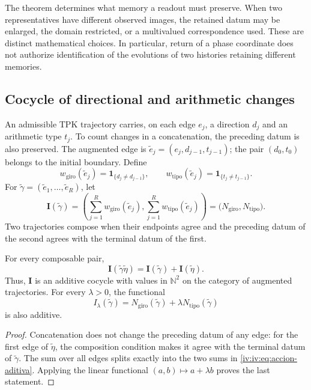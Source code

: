 The theorem determines what memory a readout
must preserve. When two representatives have different observed
images, the retained datum may be enlarged, the domain
restricted, or a multivalued correspondence used.
These are distinct mathematical choices. In particular,
return of a phase coordinate does not authorize identification
of the evolutions of two histories retaining different
memories.

\subsection{Cocycle of directional and arithmetic changes}

An admissible TPK trajectory carries, on each edge
\(e_j\), a direction \(d_j\) and an arithmetic type
\(t_j\). To count changes in a concatenation,
the preceding datum is also preserved. The augmented edge is
\(\widetilde e_j=(e_j,d_{j-1},t_{j-1})\); the pair
\((d_0,t_0)\) belongs to the initial boundary. Define
\[
 w_{\mathrm{giro}}(\widetilde e_j)
       =\mathbf1_{\{d_j\ne d_{j-1}\}},\qquad
 w_{\mathrm{tipo}}(\widetilde e_j)
       =\mathbf1_{\{t_j\ne t_{j-1}\}}.
\]
For \(\widetilde\gamma=(\widetilde e_1,\ldots,
\widetilde e_R)\), let
\begin{equation}
 \mathbf I(\widetilde\gamma)=
 \left(\sum_{j=1}^R w_{\mathrm{giro}}(\widetilde e_j),
       \sum_{j=1}^R w_{\mathrm{tipo}}(\widetilde e_j)\right)
 =\bigl(N_{\mathrm{giro}},N_{\mathrm{tipo}}\bigr).
 \label{iv:iv:eq:cociclo-accion}
\end{equation}
Two trajectories compose when their endpoints agree
and the preceding datum of the second agrees with the terminal
datum of the first.

\begin{proposition}
\label{iv:iv:prop:accion-aditiva}
For every composable pair,
\begin{equation}
 \mathbf I(\widetilde\gamma\widetilde\eta)
 =\mathbf I(\widetilde\gamma)+\mathbf I(\widetilde\eta).
 \label{iv:iv:eq:accion-aditiva}
\end{equation}
Thus, \(\mathbf I\) is an additive cocycle with values
in \(\mathbb N^2\) on the category of augmented
trajectories. For every \(\lambda>0\), the functional
\[
 I_\lambda(\widetilde\gamma)
 =N_{\mathrm{giro}}(\widetilde\gamma)
      +\lambda N_{\mathrm{tipo}}(\widetilde\gamma)
\]
is also additive.
\end{proposition}
\begin{proof}
Concatenation does not change the preceding datum of any
edge: for the first edge of \(\widetilde\eta\),
the composition condition makes it agree with the terminal datum
of \(\widetilde\gamma\). The sum over all edges
splits exactly into the two sums in
\eqref{iv:iv:eq:accion-aditiva}. Applying the linear functional
\((a,b)\mapsto a+\lambda b\) proves the last statement.
\end{proof}

